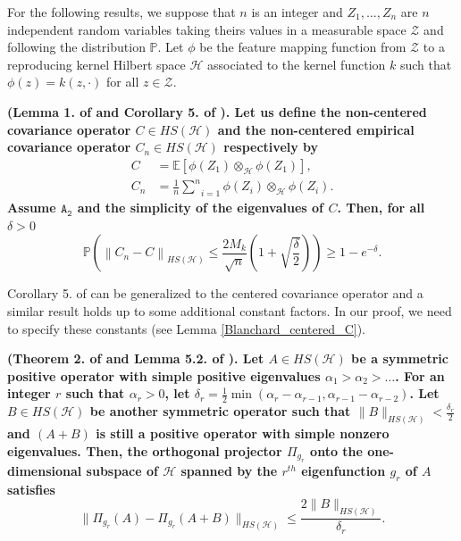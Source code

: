 \documentclass[twoside,11pt]{article}
\newcommand{\Hk}{\mathcal{H}}
\newcommand{\HSk}{HS(\mathcal{H})}
\newcommand{\PPO}{\mathbb{P} }
\newcommand{\EE}{\mathbb{E}}%
\newcommand{\A}[1]{$\mathtt{A_#1}$}
\begin{document}
For the following results, we suppose that $n$ is an integer and $Z_1, \ldots, Z_n$ are $n$ independent random variables taking theirs values in a measurable space $\mathcal{Z}$ and following the distribution $\mathbb{P}$. Let $\phi$ be the feature mapping function from $\mathcal{Z}$ to a reproducing kernel Hilbert space $\Hk$ associated to the kernel function $k$ such that $\phi(z) = k(z,\cdot)$ for all $z \in \mathcal{Z}$. 
\begin{theorem}
	\bf{(Lemma 1. of \cite{zwald2005convergence} and Corollary 5. of \cite{shawe2003estimating}).\rm} 
	\normalfont
	Let us define the non-centered covariance operator $C \in \HSk$ and the non-centered empirical covariance operator $C_n \in \HSk$ respectively by 
\begin{align*}
    C &= \EE[\phi(Z_1) \otimes_{\Hk} \phi(Z_1)], \\
    C_n &= \frac{1}{n} \underset{i=1}{\overset{n}{\sum}} \phi(Z_i) \otimes_{\Hk} \phi(Z_i).
\end{align*}
Assume \A{2} and the simplicity of the eigenvalues of $C$. 
Then, for all $\delta>0$ 
\begin{equation*}
     \PPO \left( \left \| C_n - C \right \|_{\HSk} \leq \frac{2 M_k}{\sqrt{n}} \left( 1 + \sqrt{\frac{\delta}{2}}\right) \right) \geq 1 - e^{-\delta}.
\end{equation*}
\label{Blanchard_non_centered_C}
\end{theorem}
\begin{remark}
    Corollary 5. of \citep{shawe2003estimating} can be generalized to the centered covariance operator and a similar result holds up to some additional constant factors. In our proof, we need to specify these constants (see Lemma \ref{Blanchard_centered_C}). 
\end{remark}
\begin{theorem}
	\bf{(Theorem 2. of \cite{zwald2005convergence} and Lemma 5.2. of \cite{koltchinskii2000random}). \rm} 
	\normalfont
Let $A \in \HSk$ be a symmetric positive operator with simple positive eigenvalues $\alpha_1 > \alpha_2 > \ldots$. For an integer $r$ such that $\alpha_r >0$, let $\delta_r = \frac{1}{2}\min(\alpha_r - \alpha_{r-1}, \alpha_{r-1} - \alpha_{r-2})$.
Let $B \in \HSk$ be another symmetric operator such that $\|B\|_{\HSk} < \frac{\delta_r}{2}$ and $(A+B)$ is still a positive operator with simple nonzero eigenvalues. 
Then, the orthogonal projector $\Pi_{g_r}$ onto the one-dimensional subspace of $\Hk$ spanned by the $r^{th}$ eigenfunction $g_r$ of $A$ satisfies 
$$ \|\Pi_{g_r}(A) - \Pi_{g_r}(A+B) \|_{\HSk} \leq \frac{2 \|B\|_{\HSk}}{\delta_r}.$$
\label{Zwald_Blanchard_Theo}
\end{theorem}
\end{document}
